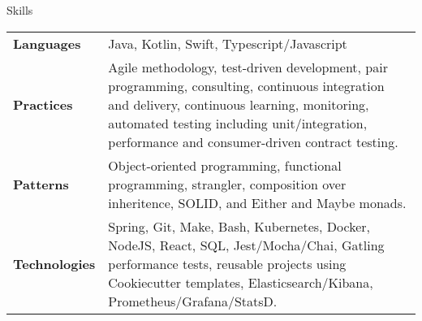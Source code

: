 \begin{section}{Skills}
  \begin{tabularx}{\linewidth}{@{}l X@{}}
    \textbf{Languages} &\small{Java, Kotlin, Swift, Typescript/Javascript} \\
    \textbf{Practices} &\small{Agile methodology, test-driven development, pair programming, consulting, continuous integration and delivery, continuous learning, monitoring, automated testing including unit/integration, performance and consumer-driven contract testing.} \\
    \textbf{Patterns} &\small{Object-oriented programming, functional programming, strangler, composition over inheritence, SOLID, and Either and Maybe monads.} \\
    \textbf{Technologies} &\small{Spring, Git, Make, Bash, Kubernetes, Docker, NodeJS, React, SQL, Jest/Mocha/Chai, Gatling performance tests, reusable projects using Cookiecutter templates, Elasticsearch/Kibana, Prometheus/Grafana/StatsD.} \\ 
  \end{tabularx}
\end{section}

